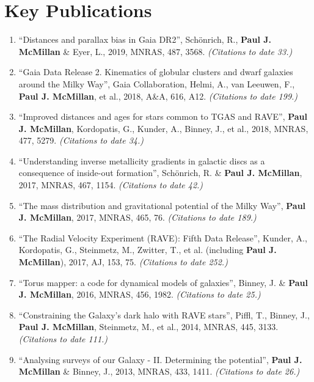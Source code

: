 \documentclass{resume}
\begin{document}
\section*{Key Publications}

\begin{enumerate}
\item ``Distances and parallax bias in Gaia DR2'', Sch\"onrich, R., \textbf{Paul J. McMillan} \& Eyer, L., 2019, MNRAS, 487, 3568. \textit{(Citations to date 33.)}

\item ``Gaia Data Release 2. Kinematics of globular clusters and dwarf galaxies around the Milky Way'', Gaia Collaboration, Helmi, A., van Leeuwen, F., \textbf{Paul J. McMillan}, et al., 2018, A\&A, 616, A12. \textit{(Citations to date 199.)}

\item ``Improved distances and ages for stars common to TGAS and RAVE'', \textbf{Paul J. McMillan}, Kordopatis, G., Kunder, A., Binney, J., et al., 2018, MNRAS, 477, 5279. \textit{(Citations to date 34.)}

\item ``Understanding inverse metallicity gradients in galactic discs as a consequence of inside-out formation'', Sch\"onrich, R. \& \textbf{Paul J. McMillan}, 2017, MNRAS, 467, 1154. \textit{(Citations to date 42.)}

\item ``The mass distribution and gravitational potential of the Milky Way'', \textbf{Paul J. McMillan}, 2017, MNRAS, 465, 76. \textit{(Citations to date 189.)}

\item ``The Radial Velocity Experiment (RAVE): Fifth Data Release'', Kunder, A., Kordopatis, G., Steinmetz, M., Zwitter, T., et al. (including \textbf{Paul J. McMillan}), 2017, AJ, 153, 75. \textit{(Citations to date 252.)}

\item ``Torus mapper: a code for dynamical models of galaxies'', Binney, J. \& \textbf{Paul J. McMillan}, 2016, MNRAS, 456, 1982. \textit{(Citations to date 25.)}

\item ``Constraining the Galaxy's dark halo with RAVE stars'', Piffl, T., Binney, J., \textbf{Paul J. McMillan}, Steinmetz, M., et al., 2014, MNRAS, 445, 3133. \textit{(Citations to date 111.)}

\item ``Analysing surveys of our Galaxy - II. Determining the potential'', \textbf{Paul J. McMillan} \& Binney, J., 2013, MNRAS, 433, 1411. \textit{(Citations to date 26.)}


\end{enumerate}
\end{document}
